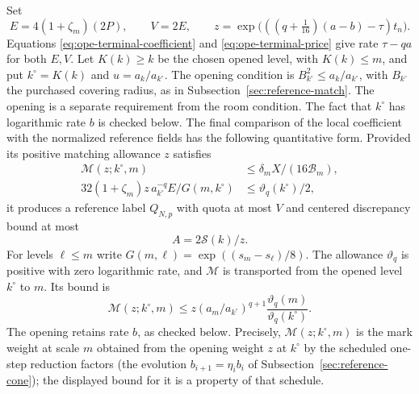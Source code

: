 Set
\begin{equation}\label{eq:ope-terminal-price}
 E=4(1+\zeta_m)(2P),\qquad V=2E,
 \qquad z=\exp\bigl(((q+\tfrac1{16})(a-b)-\tau)t_n\bigr).
\end{equation}
Equations \eqref{eq:ope-terminal-coefficient} and
\eqref{eq:ope-terminal-price} give rate $\tau-qa$ for both $E,V$.
Let $K(k)\ge k$ be the chosen opened level, with $K(k)\le m$,
and put $k^\circ=K(k)$ and $u=a_k/a_{k^\circ}$. The opening condition
is $B_{k^\circ}^2\le a_k/a_{k^\circ}$, with $B_{k^\circ}$ the purchased
covering radius, as in Subsection~\ref{sec:reference-match}. The opening
is a separate requirement from the room condition. The fact that $k^\circ$
has logarithmic rate $b$ is checked below. The final comparison of
the local coefficient with the normalized reference fields has the following
quantitative form. Provided its
positive matching allowance $z$ satisfies
\begin{align}
 \mathcal M(z;k^\circ,m)&\leq\delta_m X/(16\mathcal B_m),
       \label{eq:ope-match-pay-one}\\
 32(1+\zeta_m)z\,a_{k^\circ}^{-q}
       E/G(m,k^\circ)&\leq\vartheta_q(k^\circ)/2,
       \label{eq:ope-match-pay-two}
\end{align}
it produces a reference label $Q_{N,p}$ with quota at most $V$ and
centered discrepancy bound at most
\begin{equation}\label{eq:ope-cutoff-discrepancy}
 A=2\mathcal S(k)/z.
\end{equation}
For levels $\ell\le m$ write $G(m,\ell)=\exp((s_m-s_\ell)/8)$.
The allowance $\vartheta_q$ is positive with zero logarithmic rate, and
$\mathcal M$ is transported from the opened level $k^\circ$ to $m$.
Its bound is
\[
 \mathcal M(z;k^\circ,m)\leq
 z(a_m/a_{k^\circ})^{q+1}\frac{\vartheta_q(m)}{\vartheta_q(k^\circ)}.
\]
The opening retains rate $b$, as checked below. Precisely,
$\mathcal M(z;k^\circ,m)$ is the mark weight at scale $m$ obtained
from the opening weight $z$ at $k^\circ$
by the scheduled one-step reduction factors (the evolution
$b_{i+1}=\eta_ib_i$ of Subsection~\ref{sec:reference-cone}); the displayed
bound for it is a property of that schedule.

